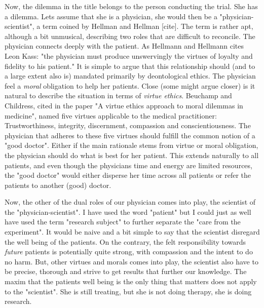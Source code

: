 \documentclass[12p]{article}
\begin{document}
Now, the dilemma in the title belongs to the person conducting the trial.
She has a dilemma.
Lets assume that she is a physician, she would then be a "physician-scientist", a term coined by Hellman and Hellman [cite].
The term is rather apt, although a bit unmusical, describing two roles that are difficult to reconcile.
The physician connects deeply with the patient.
As Hellmann and Hellmann cites Leon Kass: "the physician must produce unswervingly the virtues of loyalty and fidelity to his patient."
It is simple to argue that this relationship should (and to a large extent also is) mandated primarily by deontological ethics.
The physician feel a \emph{moral} obligation to help her patients.
Close (some might argue closer) is it natural to describe the situation in terms of \emph{virtue ethics}.
Beuchamp and Childress, cited in the paper "A virtue ethics approach to moral dilemmas in medicine", named five virtues applicable to the medical practitioner:
Trustworthiness, integrity, discernment, compassion and conscientiousness.
The physician that adheres to these five virtues should fulfill the common notion of a "good doctor".
Either if the main rationale stems from virtue or moral obligation, the physician should do what is best for her patient.
This extends naturally to all patients, and even though the physicians time and energy are limited resources, the "good doctor" would either disperse her time across all patients or refer the patients to another (good) doctor.

Now, the other of the dual roles of our physician comes into play, the scientist of the "physician-scientist".
I have used the word "patient" but I could just as well have used the term "research subject" to further separate the "care from the experiment".
It would be naive and a bit simple to say that the scientist disregard the well being of the patients.
On the contrary, the felt responsibility towards \emph{future} patients is potentially quite strong, with compassion and the intent to do no harm.
But, other virtues and morals comes into play, the scientist also have to be precise, thorough and strive to get results that further our knowledge.
The maxim that the patients well being is the only thing that matters does not apply to the "scientist".
She is still treating, but she is not doing therapy, she is doing research.
\end{document}

